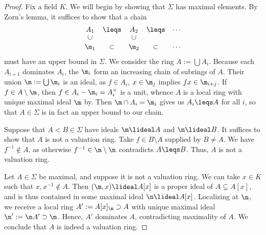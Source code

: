 \documentclass[12pt]{amsart}
\begin{document}
\begin{proof}
  Fix a field $K$.
  We will begin by showing that $\Sigma$ has maximal elements.
  By Zorn's lemma, it suffices to show that a chain 
  \[
    \begin{matrix}
      A_1&\leqs & A_2&\leqs &\cdots \\
      \rotatebox{90}{$\subset$}&&\rotatebox{90}{$\subset$}\\
      \m_1&\subset & \m_2&\subset &\cdots \\
    \end{matrix}
  \] 
  must have an upper bound in $\Sigma$.
  We consider the ring $A:=\bigcup A_i$.
  Because each $A_{i+1}$ dominates $A_i$, the $\m_i$ form an increasing chain of subrings of $A$.
  Their union $\m:=\bigcup \m_i$ is an ideal, as $f\in A_i$, $x\in \m_j$ implies $fx\in \m_{i+j}$.
  If $f\in A\setminus \m$, then $f\in A_i-\m_i=A_i^\times$ is a unit, whence $A$ is a local ring with unique maximal ideal $\m$ by.
  Then $\m\cap A_i=\m_i$ gives us $A_i\leqs A$ for all $i$, so that $A\in \Sigma$ is in fact an upper bound to our chain.

  Suppose that $A<B\in \Sigma$ have ideals $\m\lideal A$ and $\n \lideal B$. 
  It suffices to show that $A$ is not a valuation ring.
  Take $f\in B\setminus A$ supplied by $B\neq A$.
  We have $f^{-1}\notin A$, as otherwise $f^{-1}\in \m\setminus \n$ contradicts $A\leqs B$.
  Thus, $A$ is not a valuation ring.

  Let $A\in \Sigma$ be maximal, and suppose it is not a valuation ring.
  We can take $x\in K$ such that $x,x^{-1}\notin A$.
  Then $(\m,x)\lideal A[x]$ is a proper ideal of $A\subsetneq A[x]$, and is thus contained in some maximal ideal $\n\lideal A[x]$.
  Localizing at $\n$, we receive a local ring $A':=A[x]_\n\supset A$ with unique maximal ideal $\n':= \n A'\supset \m$.
  Hence, $A'$ dominates $A$, contradicting maximality of $A$.
  We conclude that $A$ is indeed a valuation ring.
\end{proof}
\end{document}

